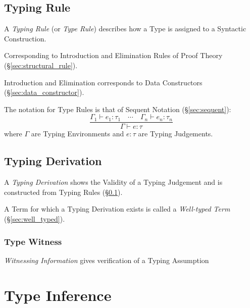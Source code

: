 \subsection{Typing Rule}\label{sec:typing_rule}

A \emph{Typing Rule} (or \emph{Type Rule}) describes how a Type is
assigned to a Syntactic Construction.

Corresponding to Introduction and Elimination Rules of Proof Theory
(\S\ref{sec:structural_rule}).

Introduction and Elimination corresponds to Data Constructors
(\S\ref{sec:data_constructor}).

The notation for Type Rules is that of Sequent Notation
(\S\ref{sec:sequent}):
\[
  {
    \frac
    { \Gamma_1 \vdash e_1:\tau_1 \quad \cdots
      \quad \Gamma_n \vdash e_n:\tau_n }
    { \Gamma \vdash e:\tau }
  }
\]
where $\Gamma$ are Typing Environments and $e:\tau$ are Typing
Judgements.



\subsection{Typing Derivation}\label{sec:typing_derivation}

A \emph{Typing Derivation} shows the Validity of a Typing Judgement
and is constructed from Typing Rules (\S\ref{sec:typing_rule}).

A Term for which a Typing Derivation exists is called a
\emph{Well-typed Term} (\S\ref{sec:well_typed}).



\subsubsection{Type Witness}\label{sec:type_witness}

\emph{Witnessing Information} gives verification of a Typing
Assumption



\section{Type Inference}\label{sec:type_inference}



